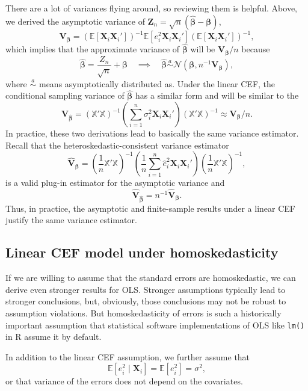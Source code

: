 \documentclass[
  letterpaper,
  DIV=11,
  numbers=noendperiod]{scrreprt}
\newcommand{\mb}{\symbf}
\newcommand{\E}{\mathbb{E}}
\newcommand{\N}{\mathcal{N}}
\newcommand{\X}{\mb{X}}
\newcommand{\Xmat}{\mathbb{X}}
\newcommand{\bfbeta}{\mb{\beta}}
\newcommand{\bhat}{\widehat{\mb{\beta}}}
\theoremstyle{plain}
\theoremstyle{definition}
\theoremstyle{definition}
\theoremstyle{remark}
\begin{document}
There are a lot of variances flying around, so reviewing them is
helpful. Above, we derived the asymptotic variance of
\(\mb{Z}_{n} = \sqrt{n}(\bhat - \bfbeta)\), \[
\mb{V}_{\bfbeta} = \left( \E[\X_i\X_i'] \right)^{-1}\E[e_i^2\X_i\X_i']\left( \E[\X_i\X_i'] \right)^{-1},
\] which implies that the approximate variance of \(\bhat\) will be
\(\mb{V}_{\bfbeta} / n\) because \[
\bhat = \frac{Z_n}{\sqrt{n}} + \bfbeta \quad\implies\quad \bhat \overset{a}{\sim} \N(\bfbeta, n^{-1}\mb{V}_{\bfbeta}),
\] where \(\overset{a}{\sim}\) means asymptotically distributed as.
Under the linear CEF, the conditional sampling variance of \(\bhat\) has
a similar form and will be similar to the\\
\[
\mb{V}_{\bhat} = \left( \Xmat'\Xmat \right)^{-1}\left( \sum_{i=1}^n \sigma^2_i \X_i\X_i' \right) \left( \Xmat'\Xmat \right)^{-1} \approx \mb{V}_{\bfbeta} / n.
\] In practice, these two derivations lead to basically the same
variance estimator. Recall that the heteroskedastic-consistent variance
estimator \[
\widehat{\mb{V}}_{\bfbeta} = \left( \frac{1}{n} \Xmat'\Xmat \right)^{-1} \left( \frac{1}{n} \sum_{i=1}^n\widehat{e}_i^2\X_i\X_i' \right) \left( \frac{1}{n} \Xmat'\Xmat \right)^{-1},
\] is a valid plug-in estimator for the asymptotic variance and \[
\widehat{\mb{V}}_{\bhat} = n^{-1}\widehat{\mb{V}}_{\bfbeta}.
\] Thus, in practice, the asymptotic and finite-sample results under a
linear CEF justify the same variance estimator.

\hypertarget{linear-cef-model-under-homoskedasticity}{%
\subsection{Linear CEF model under
homoskedasticity}\label{linear-cef-model-under-homoskedasticity}}

If we are willing to assume that the standard errors are homoskedastic,
we can derive even stronger results for OLS. Stronger assumptions
typically lead to stronger conclusions, but, obviously, those
conclusions may not be robust to assumption violations. But
homoskedasticity of errors is such a historically important assumption
that statistical software implementations of OLS like \texttt{lm()} in R
assume it by default.

\begin{tcolorbox}[enhanced jigsaw, opacityback=0, breakable, bottomtitle=1mm, opacitybacktitle=0.6, coltitle=black, leftrule=.75mm, toptitle=1mm, colback=white, titlerule=0mm, colframe=quarto-callout-note-color-frame, rightrule=.15mm, bottomrule=.15mm, toprule=.15mm, title=\textcolor{quarto-callout-note-color}{\faInfo}\hspace{0.5em}{Assumption: Homoskedasticity with a linear CEF}, left=2mm, arc=.35mm, colbacktitle=quarto-callout-note-color!10!white]

In addition to the linear CEF assumption, we further assume that \[
\E[e_i^2 \mid \X_i] = \E[e_i^2] = \sigma^2,
\] or that variance of the errors does not depend on the covariates.

\end{tcolorbox}
\end{document}
